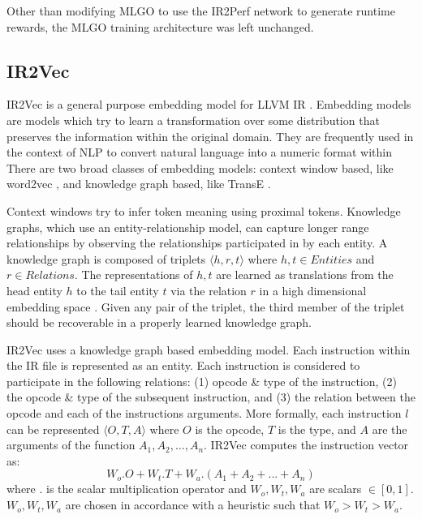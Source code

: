 \documentclass[nohyperref]{article}
\theoremstyle{plain}
\theoremstyle{definition}
\theoremstyle{remark}
\begin{document}
Other than modifying MLGO to use the IR2Perf network to generate runtime rewards, the MLGO training architecture was left unchanged.


\subsection{IR2Vec}
IR2Vec is a general purpose embedding model for LLVM IR \cite{ir2vec}. Embedding models are models which try to learn a transformation over some distribution that preserves the information within the original domain. They are frequently used in the context of NLP to convert natural language into a numeric format within There are two broad classes of embedding models: context window based, like word2vec \cite{word2vec}, and knowledge graph based, like TransE \cite{transE}. 

Context windows try to infer token meaning using proximal tokens. Knowledge graphs, which use an entity-relationship model, can capture longer range relationships by observing the relationships participated in by each entity. A knowledge graph is composed of triplets $\langle h, r, t \rangle$ where $h, t \in Entities$ and $r \in Relations$. The representations of $h, t$ are learned as translations from the head entity $h$ to the tail entity $t$ via the relation $r$ in a high dimensional embedding space \cite{ir2vec}. Given any pair of the triplet, the third member of the triplet should be recoverable in a properly learned knowledge graph.


IR2Vec uses a knowledge graph based embedding model. Each instruction within the IR file is represented as an entity. Each instruction is considered to participate in the following relations: (1) opcode \& type of the instruction, (2) the opcode \& type of the subsequent instruction, and (3) the relation between the opcode and each of the instructions arguments. More formally, each instruction $l$ can be represented $\langle O, T, A \rangle$ where $O$ is the opcode, $T$ is the type, and $A$ are the arguments of the function $A_1, A_2, ..., A_n$. IR2Vec computes the instruction vector as:
\begin{equation}\label{eq:ir2vec-inst-vec}
    W_o.O + W_t.T + W_a.(A_1 + A_2 + ... + A_n)
\end{equation}
where $.$ is the scalar multiplication operator and $W_o, W_t, W_a$ are scalars $\in [0, 1]$. $W_o, W_t, W_a$ are chosen in accordance with a heuristic such that $W_o > W_t > W_a$.
\end{document}
